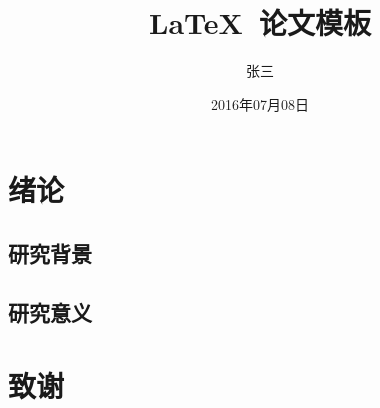 \documentclass{swustthesis}
\title{\LaTeX\ 论文模板}
\author{张三}
\date{2016年07月08日}
\begin{document}
\maketitle

\frontmatter
\tableofcontents

\mainmatter
\chapter{绪论}
\section{研究背景}
\section{研究意义}

\backmatter
\chapter{致谢}
\end{document}
